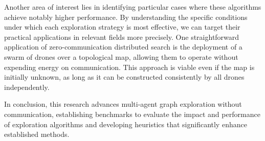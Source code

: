 Another area of interest lies in identifying particular cases where these algorithms achieve notably higher performance. By understanding the specific conditions under which each exploration strategy is most effective, we can target their practical applications in relevant fields more precisely. One straightforward application of zero-communication distributed search is the deployment of a swarm of drones over a topological map, allowing them to operate without expending energy on communication. This approach is viable even if the map is initially unknown, as long as it can be constructed consistently by all drones independently.

In conclusion, this research advances multi-agent graph exploration without communication, establishing benchmarks to evaluate the impact and performance of exploration algorithms and developing heuristics that significantly enhance established methods.